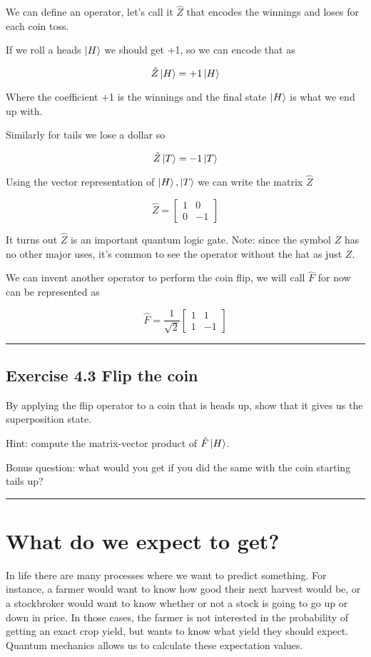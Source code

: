 \documentclass{book}
\begin{document}
We can define an operator, let's call it $\hat{Z}$ that encodes the winnings and loses for each coin toss. 

If we roll a heads $\ket{H}$ we should get +1, so we can encode that as 

$$
\hat{Z}\ket{H} = +1 \ket{H}
$$

Where the coefficient +1 is the winnings and the final state $\ket{H}$ is what we end up with. 

Similarly for tails we lose a dollar so 

$$
\hat{Z}\ket{T} = -1 \ket{T}
$$

Using the vector representation of $\ket{H}, \ket{T}$ we can write the matrix $\hat{Z}$

$$ \hat{Z} = \begin{bmatrix} 1 & 0 \\ 0 & -1 \end{bmatrix} $$

It turns out $\hat{Z}$ is an important quantum logic gate. Note: since the symbol $Z$ has no other major uses, it's common to see the operator without the hat as just $Z$.


We can invent another operator to perform the coin flip, we will call $\hat{F}$ for now can be represented as 

$$
\hat{F} =  \frac{1}{\sqrt{2}} \begin{bmatrix} 1 & 1 \\ 1 & -1 \end{bmatrix}
$$

\hrule
\subsection{Exercise 4.3 Flip the coin}   

By applying the flip operator to a coin that is heads up, show that it gives us the superposition state.  

Hint: compute the matrix-vector product of $\hat{F}\ket{H}$.   
  
Bonus question: what would you get if you did the same with the coin starting tails up?  

\hrule

\section{What do we expect to get?}

In life there are many processes where we want to predict something. For instance, a farmer would want to know how good their next harvest would be, or a stockbroker would want to know whether or not a stock is going to go up or down in price. In those cases, the farmer is not interested in the probability of getting an exact crop yield, but wants to know what yield they should expect. Quantum mechanics allows us to calculate these expectation values.
\end{document}
